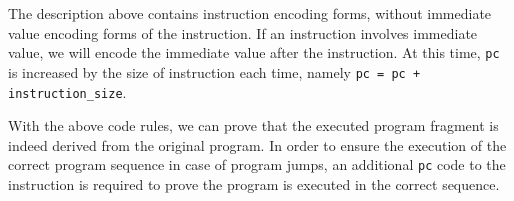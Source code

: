 The description above contains instruction encoding forms, without immediate value encoding forms of the instruction. If an instruction involves immediate value, we will encode the immediate value after the instruction. At this time, \verb|pc| is increased by the size of instruction each time, namely \verb|pc = pc + instruction_size|.

With the above code rules, we can prove that the executed program fragment is indeed derived from the original program. In order to ensure the execution of the correct program sequence in case of program jumps, an additional \verb|pc| code to the instruction is required to prove the program is executed in the correct sequence.
